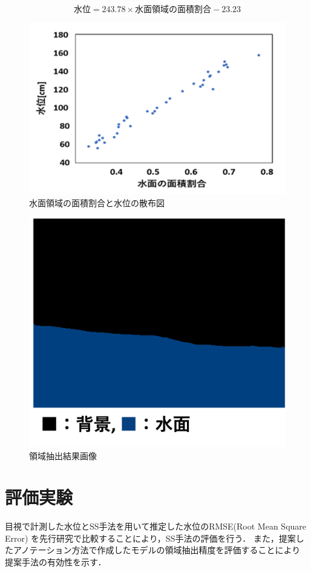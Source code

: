 \begin{equation}
  \label{change}
  \mbox{水位} =  243.78×\mbox{水面領域の面積割合}-23.23
\end{equation}

\begin{figure}[ht] 
  \begin{center}
    \includegraphics[width=0.7\linewidth]{image/soukan.png}
  \end{center}
  \caption{水面領域の面積割合と水位の散布図}
  \label{soukan}
\end{figure}

\vspace{5mm}

\begin{figure}[ht] 
  \begin{center}
    \includegraphics[width=0.5\linewidth]{image/pre_image.png}
  \end{center}
  \caption{領域抽出結果画像}
  \label{pre_image}
\end{figure}


\clearpage
\section{評価実験}
目視で計測した水位とSS手法を用いて推定した水位のRMSE(Root Mean Square Error)
を先行研究\cite{watanabe}で比較することにより，SS手法の評価を行う．
また，提案したアノテーション方法で作成したモデルの領域抽出精度を評価することにより
提案手法の有効性を示す．

